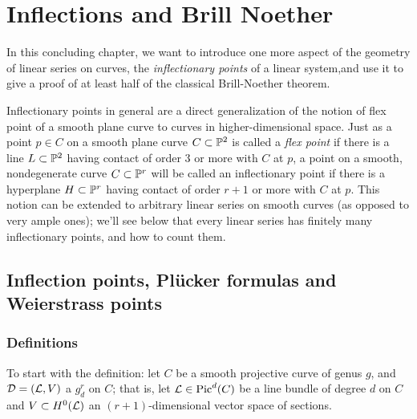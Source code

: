 

\chapter{Inflections and Brill Noether}
\label{InflectionsChapter}

In this concluding chapter, we want to introduce one more aspect of the geometry of linear series on curves, the \emph{inflectionary points} of a linear system,and use it to give a proof of at least half of the classical Brill-Noether theorem.

Inflectionary points in general are a direct generalization of the notion of flex point of a smooth plane curve to curves in higher-dimensional space. Just as a point $p \in C$ on a smooth plane curve $C \subset \PP^2$ is called a \emph{flex point} if there is a line $L \subset \PP^2$ having contact of order 3 or more with $C$ at $p$, a point on a smooth, nondegenerate curve $C \subset \PP^r$ will be called an inflectionary point if there is a hyperplane $H \subset \PP^r$ having contact of order $r+1$ or more with $C$ at $p$. This notion can be extended to arbitrary linear series on smooth curves (as opposed to very ample ones); we'll see below that every linear series has finitely many inflectionary points, and how to count them.


\section{Inflection points,  Pl\"ucker formulas and Weierstrass points}

\subsection{Definitions}

To start with the definition: let $C$ be a smooth projective curve of genus $g$, and $\cD = (\cL,V)$ a $g^r_d$ on $C$; that is, let $\cL \in \Pic^d(C)$ be a line bundle of degree $d$ on $C$ and $V \subset H^0(\cL)$ an $(r+1)$-dimensional vector space of sections.

